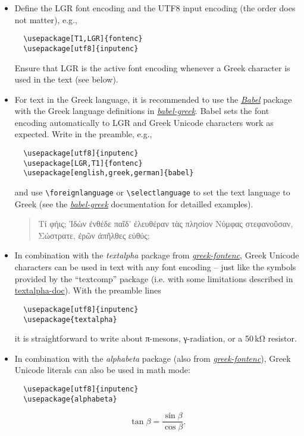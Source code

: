 \documentclass[a4paper]{scrartcl}
\begin{document}
\begin{itemize}

\item
Define the LGR font encoding and the UTF8 input encoding (the order does not
matter), e.g.,
%
\begin{verbatim}
  \usepackage[T1,LGR]{fontenc}
  \usepackage[utf8]{inputenc}
\end{verbatim}
%
Ensure that LGR is the active font encoding whenever a Greek character is
used in the text (see below).

\item
For text in the Greek language, it is recommended to use the
\href{http://www.ctan.org/pkg/babel}{\emph{Babel}} package with the Greek
language definitions in
\href{http://www.ctan.org/pkg/babel-greek}{\emph{babel-greek}}. Babel sets
the font encoding automatically to LGR and Greek Unicode characters work as
expected. Write in the preamble, e.g.,
%
\begin{verbatim}
  \usepackage[utf8]{inputenc}
  \usepackage[LGR,T1]{fontenc}
  \usepackage[english,greek,german]{babel}
\end{verbatim}
%
and use \verb+\foreignlanguage+ or \verb+\selectlanguage+ to set the text
language to Greek (see the
\href{http://www.ctan.org/pkg/babel-greek}{\emph{babel-greek}} documentation
for detailled examples).

\begin{quote}
  \greekscript
  Τί φήις; Ἱδὼν ἐνθέδε παῖδ’ ἐλευθέραν
  τὰς πλησίον Νύμφας στεφανοῦσαν, Σώστρατε,
  ἐρῶν άπῆλθες εὐθύς;
\end{quote}

\item
In combination with the \emph{textalpha} package from
\href{http://www.ctan.org/pkg/greek-fontenc}{\emph{greek-fontenc}}, Greek Unicode
characters can be used in text with any font encoding -- just like the
symbols provided by the ``textcomp'' package (i.e. with some limitations
described in
\href{http://mirrors.ctan.org/language/greek/greek-fontenc/textalpha-doc.pdf}%
{textalpha-doc}). With the preamble lines
%
\begin{verbatim}
  \usepackage[utf8]{inputenc}
  \usepackage{textalpha}
\end{verbatim}
%
it is straightforward to write about π-mesons, γ-radiation, or a 50\,kΩ
resistor.

\item
In combination with the \emph{alphabeta} package (also from
\href{http://www.ctan.org/pkg/greek-fontenc}{\emph{greek-fontenc}}),
Greek Unicode literals can also be used in math mode:
%
\begin{verbatim}
  \usepackage[utf8]{inputenc}
  \usepackage{alphabeta}
\end{verbatim}
\[
   \tan β = \frac{\sin β}{\cos β}.
\]

\end{itemize}
\end{document}
